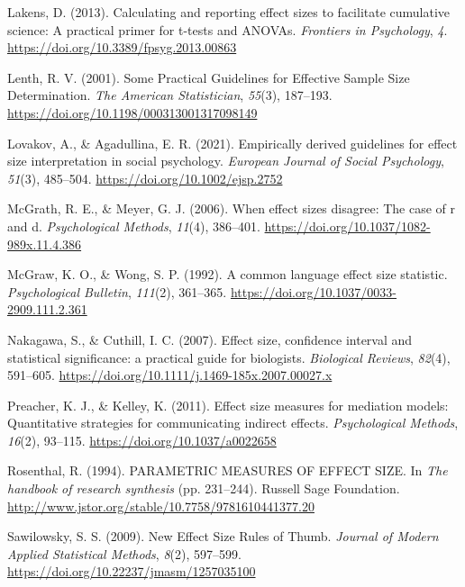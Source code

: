 \documentclass[
  ja=standard, xelatex, base=12pt]{bxjsreport}
\newlength{\cslhangindent}
\newlength{\cslentryspacingunit} %
\newenvironment{CSLReferences}[2] %
 {%
  \setlength{\parindent}{0pt}
  \ifodd #1
  \let\oldpar\par
  \def\par{\hangindent=\cslhangindent\oldpar}
  \fi
  \setlength{\parskip}{#2\cslentryspacingunit}
 }%
 {}
\begin{document}
\begin{CSLReferences}{1}{0}
\leavevmode{}%
Lakens, D. (2013). Calculating and reporting effect sizes to facilitate cumulative science: A practical primer for t-tests and ANOVAs. \emph{Frontiers in Psychology}, \emph{4}. \url{https://doi.org/10.3389/fpsyg.2013.00863}

\leavevmode{}%
Lenth, R. V. (2001). Some Practical Guidelines for Effective Sample Size Determination. \emph{The American Statistician}, \emph{55}(3), 187--193. \url{https://doi.org/10.1198/000313001317098149}

\leavevmode{}%
Lovakov, A., \& Agadullina, E. R. (2021). Empirically derived guidelines for effect size interpretation in social psychology. \emph{European Journal of Social Psychology}, \emph{51}(3), 485--504. \url{https://doi.org/10.1002/ejsp.2752}

\leavevmode{}%
McGrath, R. E., \& Meyer, G. J. (2006). When effect sizes disagree: The case of r and d. \emph{Psychological Methods}, \emph{11}(4), 386--401. \url{https://doi.org/10.1037/1082-989x.11.4.386}

\leavevmode{}%
McGraw, K. O., \& Wong, S. P. (1992). A common language effect size statistic. \emph{Psychological Bulletin}, \emph{111}(2), 361--365. \url{https://doi.org/10.1037/0033-2909.111.2.361}

\leavevmode{}%
Nakagawa, S., \& Cuthill, I. C. (2007). Effect size, confidence interval and statistical significance: a practical guide for biologists. \emph{Biological Reviews}, \emph{82}(4), 591--605. \url{https://doi.org/10.1111/j.1469-185x.2007.00027.x}

\leavevmode{}%
Preacher, K. J., \& Kelley, K. (2011). Effect size measures for mediation models: Quantitative strategies for communicating indirect effects. \emph{Psychological Methods}, \emph{16}(2), 93--115. \url{https://doi.org/10.1037/a0022658}

\leavevmode{}%
Rosenthal, R. (1994). PARAMETRIC MEASURES OF EFFECT SIZE. In \emph{The handbook of research synthesis} (pp. 231--244). Russell Sage Foundation. \url{http://www.jstor.org/stable/10.7758/9781610441377.20}

\leavevmode{}%
Sawilowsky, S. S. (2009). New Effect Size Rules of Thumb. \emph{Journal of Modern Applied Statistical Methods}, \emph{8}(2), 597--599. \url{https://doi.org/10.22237/jmasm/1257035100}


\end{CSLReferences}
\end{document}
